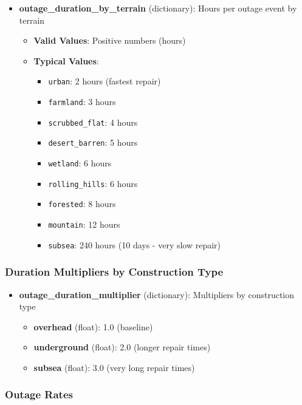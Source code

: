 \documentclass[ctcc_full_documentation.tex]{subfiles}
\begin{document}
\begin{itemize}
    \item \textbf{outage\_duration\_by\_terrain} (dictionary): Hours per outage event by terrain
    \begin{itemize}
        \item \textbf{Valid Values}: Positive numbers (hours)
        \item \textbf{Typical Values}:
        \begin{itemize}
            \item \texttt{urban}: 2 hours (fastest repair)
            \item \texttt{farmland}: 3 hours
            \item \texttt{scrubbed\_flat}: 4 hours
            \item \texttt{desert\_barren}: 5 hours
            \item \texttt{wetland}: 6 hours
            \item \texttt{rolling\_hills}: 6 hours
            \item \texttt{forested}: 8 hours
            \item \texttt{mountain}: 12 hours
            \item \texttt{subsea}: 240 hours (10 days - very slow repair)
        \end{itemize}
    \end{itemize}
\end{itemize}

\subsubsection{Duration Multipliers by Construction Type}

\begin{itemize}
    \item \textbf{outage\_duration\_multiplier} (dictionary): Multipliers by construction type
    \begin{itemize}
        \item \textbf{overhead} (float): 1.0 (baseline)
        \item \textbf{underground} (float): 2.0 (longer repair times)
        \item \textbf{subsea} (float): 3.0 (very long repair times)
    \end{itemize}
\end{itemize}

\subsubsection{Outage Rates}
\end{document}
